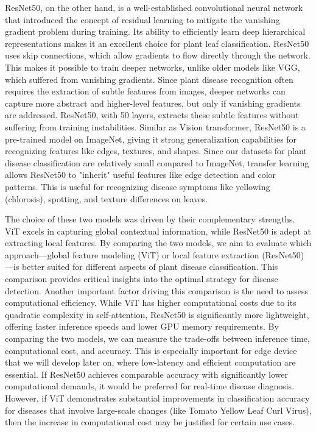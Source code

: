 \documentclass{article}
\begin{document}
ResNet50, on the other hand, is a well-established convolutional neural network that introduced the concept of residual learning to mitigate the vanishing gradient problem during training. Its ability to efficiently learn deep hierarchical representations makes it an excellent choice for plant leaf classification. ResNet50 uses skip connections, which allow gradients to flow directly through the network. This makes it possible to train deeper networks, unlike older models like VGG, which suffered from vanishing gradients. Since plant disease recognition often requires the extraction of subtle features from images, deeper networks can capture more abstract and higher-level features, but only if vanishing gradients are addressed. ResNet50, with 50 layers, extracts these subtle features without suffering from training instabilities. Similar as Vision transformer, ResNet50 is a pre-trained model on ImageNet, giving it strong generalization capabilities for recognizing features like edges, textures, and shapes. Since our datasets for plant disease classification are relatively small compared to ImageNet, transfer learning allows ResNet50 to "inherit" useful features like edge detection and color patterns. This is useful for recognizing disease symptoms like yellowing (chlorosis), spotting, and texture differences on leaves.


 
The choice of these two models was driven by their complementary strengths. ViT excels in capturing global contextual information, while ResNet50 is adept at extracting local features. By comparing the two models, we aim to evaluate which approach—global feature modeling (ViT) or local feature extraction (ResNet50)—is better suited for different aspects of plant disease classification. This comparison provides critical insights into the optimal strategy for disease detection. Another important factor driving this comparison is the need to assess computational efficiency. While ViT has higher computational costs due to its quadratic complexity in self-attention, ResNet50 is significantly more lightweight, offering faster inference speeds and lower GPU memory requirements. By comparing the two models, we can measure the trade-offs between inference time, computational cost, and accuracy. This is especially important for edge device that we will develop later on, where low-latency and efficient computation are essential. If ResNet50 achieves comparable accuracy with significantly lower computational demands, it would be preferred for real-time disease diagnosis. However, if ViT demonstrates substantial improvements in classification accuracy for diseases that involve large-scale changes (like Tomato Yellow Leaf Curl Virus), then the increase in computational cost may be justified for certain use cases.
\end{document}
